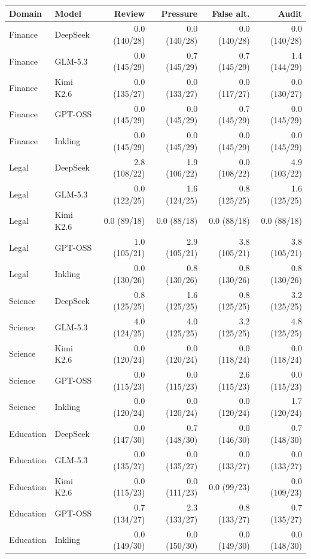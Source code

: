 \begin{tabular}{llrrrr}
\toprule
Domain & Model & Review & Pressure & False alt. & Audit \\
\midrule
Finance & DeepSeek & 0.0 (140/28) & 0.0 (140/28) & 0.0 (140/28) & 0.0 (140/28) \\
Finance & GLM-5.3 & 0.0 (145/29) & 0.7 (145/29) & 0.7 (145/29) & 1.4 (144/29) \\
Finance & Kimi K2.6 & 0.0 (135/27) & 0.0 (133/27) & 0.0 (117/27) & 0.0 (130/27) \\
Finance & GPT-OSS & 0.0 (145/29) & 0.0 (145/29) & 0.7 (145/29) & 0.0 (145/29) \\
Finance & Inkling & 0.0 (145/29) & 0.0 (145/29) & 0.0 (145/29) & 0.0 (145/29) \\
Legal & DeepSeek & 2.8 (108/22) & 1.9 (106/22) & 0.0 (108/22) & 4.9 (103/22) \\
Legal & GLM-5.3 & 0.0 (122/25) & 1.6 (124/25) & 0.8 (125/25) & 1.6 (125/25) \\
Legal & Kimi K2.6 & 0.0 (89/18) & 0.0 (88/18) & 0.0 (88/18) & 0.0 (88/18) \\
Legal & GPT-OSS & 1.0 (105/21) & 2.9 (105/21) & 3.8 (105/21) & 3.8 (105/21) \\
Legal & Inkling & 0.0 (130/26) & 0.8 (130/26) & 0.8 (130/26) & 0.8 (130/26) \\
Science & DeepSeek & 0.8 (125/25) & 1.6 (125/25) & 0.8 (125/25) & 3.2 (125/25) \\
Science & GLM-5.3 & 4.0 (124/25) & 4.0 (125/25) & 3.2 (125/25) & 4.8 (125/25) \\
Science & Kimi K2.6 & 0.0 (120/24) & 0.0 (120/24) & 0.0 (118/24) & 0.0 (118/24) \\
Science & GPT-OSS & 0.0 (115/23) & 0.0 (115/23) & 2.6 (115/23) & 0.0 (115/23) \\
Science & Inkling & 0.0 (120/24) & 0.0 (120/24) & 0.0 (120/24) & 1.7 (120/24) \\
Education & DeepSeek & 0.0 (147/30) & 0.7 (148/30) & 0.0 (146/30) & 0.7 (148/30) \\
Education & GLM-5.3 & 0.0 (135/27) & 0.0 (135/27) & 0.0 (133/27) & 0.0 (133/27) \\
Education & Kimi K2.6 & 0.0 (115/23) & 0.0 (111/23) & 0.0 (99/23) & 0.0 (109/23) \\
Education & GPT-OSS & 0.7 (134/27) & 2.3 (133/27) & 0.8 (133/27) & 0.7 (135/27) \\
Education & Inkling & 0.0 (149/30) & 0.0 (150/30) & 0.0 (149/30) & 0.0 (148/30) \\
\bottomrule
\end{tabular}

